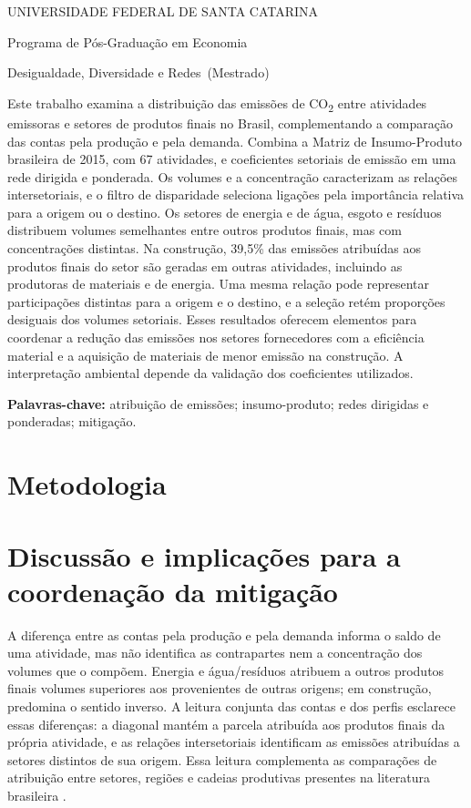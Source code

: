 \documentclass[11pt]{article}
\renewenvironment{abstract}{\par\medskip\noindent\textbf{\abstractname}\par\smallskip\small\setstretch{1}\noindent}{\par\medskip}
\newcommand{\instituicao}{UNIVERSIDADE FEDERAL DE SANTA CATARINA}
\newcommand{\departamento}{Programa de Pós-Graduação em Economia}
\newcommand{\curso}{Mestrado}
\newcommand{\disciplina}{Desigualdade, Diversidade e Redes}
\newcommand{\titulo}{Rede de emissões de CO\textsubscript{2} no Brasil}
\newcommand{\autor}{Gabriel Pincelli Cintra}
\newcommand{\local}{Florianópolis}
\newcommand{\dataentrega}{18 de outubro de 2026}
\newcommand{\imprimirtitulodois}{
\begin{center}
  {\small\MakeUppercase{\instituicao}\par}
  {\small \departamento\par}
  {\small \disciplina\ (\curso)\par}
  \vspace{1em}{\LARGE\bfseries \titulo\par}
  \vspace{0.7em}{\normalsize \autor\par}
  \vspace{0.3em}{\small \local, \dataentrega\par}
\end{center}
\vspace{0.4em}}
\begin{document}
\imprimirtitulodois
\thispagestyle{empty}
\begin{abstract}
Este trabalho examina a distribuição das emissões de CO\textsubscript{2} entre atividades emissoras e setores de produtos finais no Brasil, complementando a comparação das contas pela produção e pela demanda. Combina a Matriz de Insumo-Produto brasileira de 2015, com 67 atividades, e coeficientes setoriais de emissão em uma rede dirigida e ponderada. Os volumes e a concentração caracterizam as relações intersetoriais, e o filtro de disparidade seleciona ligações pela importância relativa para a origem ou o destino. Os setores de energia e de água, esgoto e resíduos distribuem volumes semelhantes entre outros produtos finais, mas com concentrações distintas. Na construção, 39,5\% das emissões atribuídas aos produtos finais do setor são geradas em outras atividades, incluindo as produtoras de materiais e de energia. Uma mesma relação pode representar participações distintas para a origem e o destino, e a seleção retém proporções desiguais dos volumes setoriais. Esses resultados oferecem elementos para coordenar a redução das emissões nos setores fornecedores com a eficiência material e a aquisição de materiais de menor emissão na construção. A interpretação ambiental depende da validação dos coeficientes utilizados.
\end{abstract}
\noindent\textbf{Palavras-chave:} atribuição de emissões; insumo-produto; redes dirigidas e ponderadas; mitigação.

\clearpage

\clearpage
\section{Metodologia}



\clearpage

\clearpage
\section{Discussão e implicações para a coordenação da mitigação}

A diferença entre as contas pela produção e pela demanda informa o saldo de uma atividade, mas não identifica as contrapartes nem a concentração dos volumes que o compõem. Energia e água/resíduos atribuem a outros produtos finais volumes superiores aos provenientes de outras origens; em construção, predomina o sentido inverso. A leitura conjunta das contas e dos perfis esclarece essas diferenças: a diagonal mantém a parcela atribuída aos produtos finais da própria atividade, e as relações intersetoriais identificam as emissões atribuídas a setores distintos de sua origem. Essa leitura complementa as comparações de atribuição entre setores, regiões e cadeias produtivas presentes na literatura brasileira \parencite{imori2015,sanguinetAzzoni2024,montoyaEtAl2026}.
\end{document}
